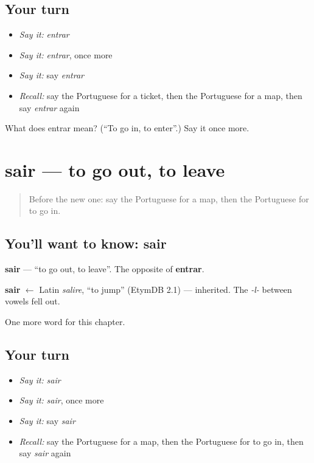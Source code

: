 \subsection*{Your turn}
\begin{itemize}
\raggedright
  \item \emph{Say it:} \emph{entrar}
  \item \emph{Say it:} \emph{entrar}, once more
  \item \emph{Say it:} say \emph{entrar}
  \item \emph{Recall:} say the Portuguese for a ticket, then the Portuguese for a map, then say \emph{entrar} again
\end{itemize}

\begin{tcolorbox}[breakable,colback=teal!4,colframe=teal!35!black,title={Before you move on}]
What does entrar mean? (\textquotedblleft{}To go in, to enter\textquotedblright{}.) Say it once more.
\end{tcolorbox}
\section[sair]{sair — to go out, to leave}

\label{lesson:PT-C55-sair}



\begin{quote}
Before the new one: say the Portuguese for a map, then the Portuguese for to go in.
\end{quote}

\subsection*{You'll want to know: sair}
\textbf{sair} — \textquotedblleft{}to go out, to leave\textquotedblright{}. The opposite of \textbf{entrar}.

\begin{cousinweb}
\textbf{sair} $\leftarrow$ Latin \emph{salire}, \textquotedblleft{}to jump\textquotedblright{} (EtymDB 2.1) — inherited. The \emph{-l-} between vowels fell out.
\end{cousinweb}

\begin{grammarlens}[title={What you've built}]
One more word for this chapter.
\end{grammarlens}

\subsection*{Your turn}
\begin{itemize}
\raggedright
  \item \emph{Say it:} \emph{sair}
  \item \emph{Say it:} \emph{sair}, once more
  \item \emph{Say it:} say \emph{sair}
  \item \emph{Recall:} say the Portuguese for a map, then the Portuguese for to go in, then say \emph{sair} again
\end{itemize}

